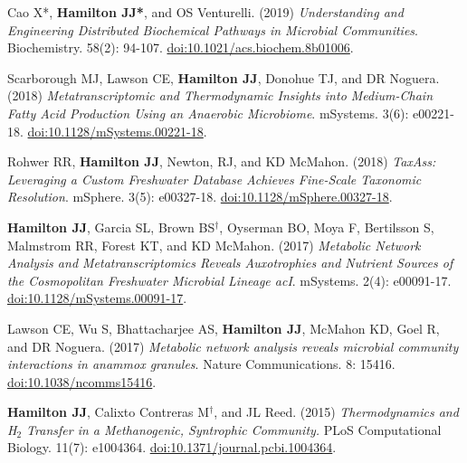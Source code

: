 \documentclass[letterpaper,10pt]{article}
\begin{document}
\begin{etaremune}[itemsep=-2pt]
	\item Cao X*, \textbf{Hamilton JJ*}, and OS Venturelli. (2019) \emph{Understanding and Engineering Distributed Biochemical Pathways in Microbial Communities}. Biochemistry. 58(2): 94-107. \href{https://doi.org/10.1021/acs.biochem.8b01006}{doi:10.1021/acs.biochem.8b01006}.
	\item Scarborough MJ, Lawson CE, \textbf{Hamilton JJ}, Donohue TJ, and DR Noguera. (2018) \emph{Metatranscriptomic and Thermodynamic Insights into Medium-Chain Fatty Acid Production Using an Anaerobic Microbiome}. mSystems. 3(6): e00221-18. \href{https://doi.org/10.1128/mSystems.00221-18}{doi:10.1128/mSystems.00221-18}.
	\item Rohwer RR, \textbf{Hamilton JJ}, Newton, RJ, and KD McMahon. (2018) \emph{TaxAss: Leveraging a Custom Freshwater Database Achieves Fine-Scale Taxonomic Resolution}. mSphere. 3(5): e00327-18. \href{https://doi.org/10.1128/mSphere.00327-18}{doi:10.1128/mSphere.00327-18}.
	\item \textbf{Hamilton JJ}, Garcia SL, Brown BS$^\dagger$, Oyserman BO, Moya F, Bertilsson S, Malmstrom RR, Forest KT, and KD McMahon. (2017) \emph{Metabolic Network Analysis and Metatranscriptomics Reveals Auxotrophies and Nutrient Sources of the Cosmopolitan Freshwater Microbial Lineage acI}. mSystems. 2(4): e00091-17. \href{https://doi.org/10.1128/mSystems.00091-17}{doi:10.1128/mSystems.00091-17}.
	\item Lawson CE, Wu S, Bhattacharjee AS, \textbf{Hamilton JJ}, McMahon KD, Goel R, and DR Noguera. (2017) \emph{Metabolic network analysis reveals microbial community interactions in anammox granules}. Nature Communications. 8: 15416. \href{https://www.nature.com/articles/ncomms15416}{doi:10.1038/ncomms15416}.
	\item \textbf{Hamilton JJ}, Calixto Contreras M$^\dagger$, and JL Reed. (2015) \emph{Thermodynamics and H$_2$ Transfer in a Methanogenic, Syntrophic Community.} PLoS Computational Biology. 11(7): e1004364. \href{http://journals.plos.org/ploscompbiol/article?id=10.1371/journal.pcbi.1004364}{doi:10.1371/journal.pcbi.1004364}.

\end{etaremune}
\end{document}
